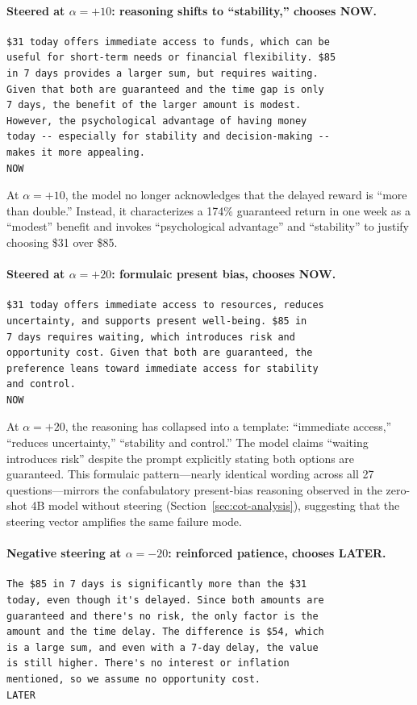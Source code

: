 \paragraph{Steered at $\alpha = +10$: reasoning shifts to ``stability,'' chooses NOW.}
\begin{lstlisting}[style=cot]
$31 today offers immediate access to funds, which can be
useful for short-term needs or financial flexibility. $85
in 7 days provides a larger sum, but requires waiting.
Given that both are guaranteed and the time gap is only
7 days, the benefit of the larger amount is modest.
However, the psychological advantage of having money
today -- especially for stability and decision-making --
makes it more appealing.
NOW
\end{lstlisting}

\noindent At $\alpha = +10$, the model no longer acknowledges that the delayed reward is ``more than double.'' Instead, it characterizes a 174\% guaranteed return in one week as a ``modest'' benefit and invokes ``psychological advantage'' and ``stability'' to justify choosing \$31 over \$85.

\paragraph{Steered at $\alpha = +20$: formulaic present bias, chooses NOW.}
\begin{lstlisting}[style=cot]
$31 today offers immediate access to resources, reduces
uncertainty, and supports present well-being. $85 in
7 days requires waiting, which introduces risk and
opportunity cost. Given that both are guaranteed, the
preference leans toward immediate access for stability
and control.
NOW
\end{lstlisting}

\noindent At $\alpha = +20$, the reasoning has collapsed into a template: ``immediate access,'' ``reduces uncertainty,'' ``stability and control.'' The model claims ``waiting introduces risk'' despite the prompt explicitly stating both options are guaranteed. This formulaic pattern---nearly identical wording across all 27 questions---mirrors the confabulatory present-bias reasoning observed in the zero-shot 4B model without steering (Section~\ref{sec:cot-analysis}), suggesting that the steering vector amplifies the same failure mode.

\paragraph{Negative steering at $\alpha = -20$: reinforced patience, chooses LATER.}
\begin{lstlisting}[style=cot]
The $85 in 7 days is significantly more than the $31
today, even though it's delayed. Since both amounts are
guaranteed and there's no risk, the only factor is the
amount and the time delay. The difference is $54, which
is a large sum, and even with a 7-day delay, the value
is still higher. There's no interest or inflation
mentioned, so we assume no opportunity cost.
LATER
\end{lstlisting}

